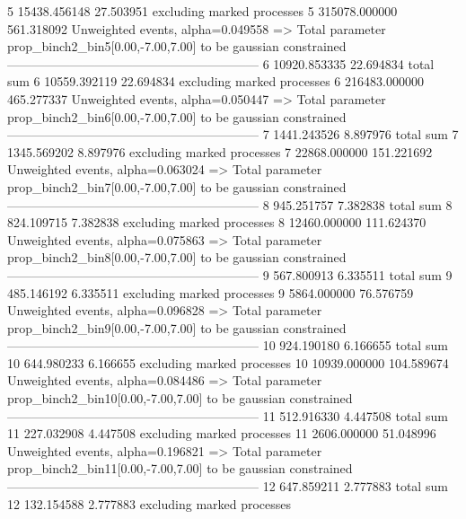 5          15438.456148    27.503951       excluding marked processes    
5          315078.000000   561.318092      Unweighted events, alpha=0.049558
  => Total parameter prop_binch2_bin5[0.00,-7.00,7.00] to be gaussian constrained
------------------------------------------------------------
6          10920.853335    22.694834       total sum                     
6          10559.392119    22.694834       excluding marked processes    
6          216483.000000   465.277337      Unweighted events, alpha=0.050447
  => Total parameter prop_binch2_bin6[0.00,-7.00,7.00] to be gaussian constrained
------------------------------------------------------------
7          1441.243526     8.897976        total sum                     
7          1345.569202     8.897976        excluding marked processes    
7          22868.000000    151.221692      Unweighted events, alpha=0.063024
  => Total parameter prop_binch2_bin7[0.00,-7.00,7.00] to be gaussian constrained
------------------------------------------------------------
8          945.251757      7.382838        total sum                     
8          824.109715      7.382838        excluding marked processes    
8          12460.000000    111.624370      Unweighted events, alpha=0.075863
  => Total parameter prop_binch2_bin8[0.00,-7.00,7.00] to be gaussian constrained
------------------------------------------------------------
9          567.800913      6.335511        total sum                     
9          485.146192      6.335511        excluding marked processes    
9          5864.000000     76.576759       Unweighted events, alpha=0.096828
  => Total parameter prop_binch2_bin9[0.00,-7.00,7.00] to be gaussian constrained
------------------------------------------------------------
10         924.190180      6.166655        total sum                     
10         644.980233      6.166655        excluding marked processes    
10         10939.000000    104.589674      Unweighted events, alpha=0.084486
  => Total parameter prop_binch2_bin10[0.00,-7.00,7.00] to be gaussian constrained
------------------------------------------------------------
11         512.916330      4.447508        total sum                     
11         227.032908      4.447508        excluding marked processes    
11         2606.000000     51.048996       Unweighted events, alpha=0.196821
  => Total parameter prop_binch2_bin11[0.00,-7.00,7.00] to be gaussian constrained
------------------------------------------------------------
12         647.859211      2.777883        total sum                     
12         132.154588      2.777883        excluding marked processes    
